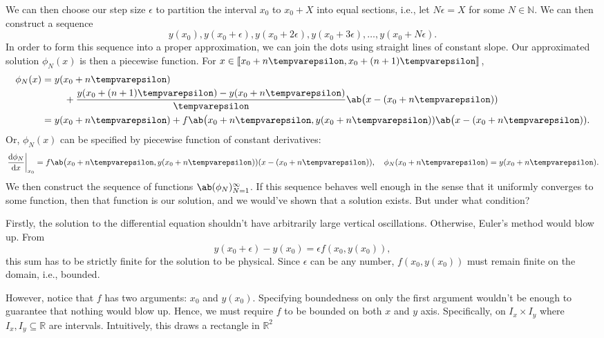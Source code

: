 We can then choose our step size \(\epsilon\) to partition the interval \(x_0\) to
\(x_0 + X\) into equal sections, i.e., let \(N\epsilon = X\) for some \(N \in \mathbb{N}\).
We can then construct a sequence
\begin{equation}
  y(x_0), y(x_0 + \epsilon), y(x_0 + 2\epsilon), y(x_0 + 3\epsilon), \dots, y(x_0 + N\epsilon).
\end{equation}
In order to form this sequence into a proper approximation, we can join the dots using
straight lines of constant slope. Our approximated solution \(\phi_N(x)\) is then a
piecewise function. For \(x \in \cintv{x_0 + n\epsilon, x_0 + (n + 1)\epsilon}\),
\begin{align}
  \phi_N(x) & = \begin{multlined}[t]
                  y(x_0 + n\epsilon) \\
                  + \frac{y(x_0 + (n + 1)\epsilon) - y(x_0 + n\epsilon)}{\epsilon}\ab\big(x
                  - (x_0 + n\epsilon))
                \end{multlined} \\
            & = y(x_0 + n\epsilon) + f\ab\big(x_0 + n\epsilon, y(x_0 + n\epsilon))\ab\big(x - (x_0 + n\epsilon)). \label{eq:existenceuniqueness-euler_phi}
\end{align}
Or, \(\phi_N(x)\) can be specified by piecewise function of constant derivatives:
\begin{equation}
  \odv{\phi_N}{x}_{x_0} = f\ab\big(x_0 + n\epsilon, y(x_0 + n\epsilon))(x - (x_0 + n\epsilon)), \quad \phi_N(x_0 + n\epsilon)
                        = y(x_0 + n\epsilon).
\end{equation}
We then construct the sequence of functions \(\sequence{\phi_N}{N = 1}{\infty}\). If this
sequence behaves well enough in the sense that it uniformly converges to some function, then that
function is our solution, and we would've shown that a solution exists. But under what condition?

Firstly, the solution to the differential equation shouldn't have arbitrarily large
vertical oscillations. Otherwise, Euler's method would blow up. From
\begin{equation}
  y(x_0 + \epsilon) - y(x_0) = \epsilon f(x_0, y(x_0)), \nonumber
\end{equation}
this sum has to be strictly finite for the solution to be physical. Since \(\epsilon\)
can be any number, \(f(x_0, y(x_0))\) must remain finite on the domain, i.e., bounded.

However, notice that \(f\) has two arguments: \(x_0\) and \(y(x_0)\). Specifying
boundedness on only the first argument wouldn't be enough to guarantee that nothing
would blow up. Hence, we must require \(f\) to be bounded on both \(x\) and \(y\)
axis. Specifically, on \(I_x \times I_y\) where \(I_x, I_y \subseteq \mathbb{R}\) are
intervals. Intuitively, this draws a rectangle in \(\mathbb{R}^2\)

